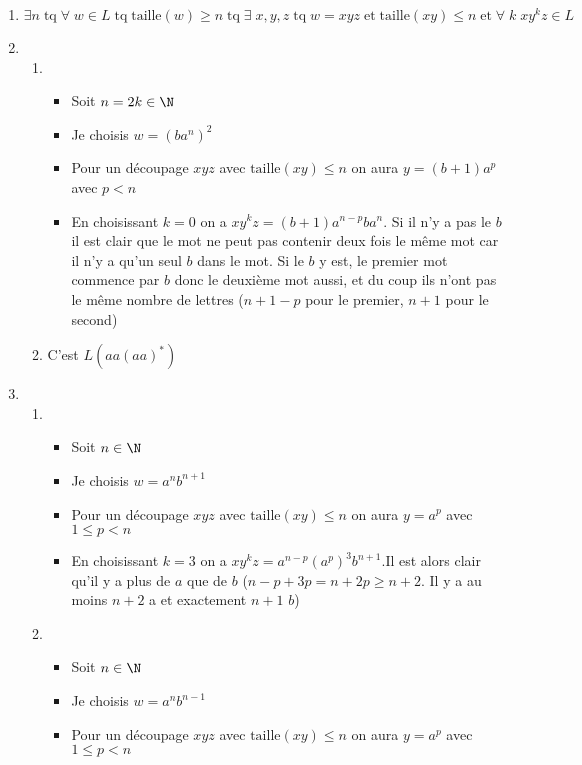 \begin{enumerate}
	\item $\exists n \; \mathrm{tq} \; \forall \; w \in L \; \mathrm{tq} \; \mathrm{taille}(w) \geq n \; \mathrm{tq} \; \exists \; x,y,z \; \mathrm{tq} \; w=xyz \; \mathrm{et} \; \mathrm{taille}(xy) \leq n \; \mathrm{et} \; \forall \; k \; xy^kz \in L$
	\item 
	\begin{enumerate}
		\item 
		\begin{itemize}
			\item Soit $n = 2k \in \N$
			\item Je choisis $w=(ba^n)^2$
			\item Pour un découpage $xyz$ avec $\mathrm{taille}(xy) \leq n$ on aura $y=(b+1)a^p$ avec $p < n$
			\item En choisissant $k=0$ on a $xy^kz = (b+1)a^{n-p}ba^n$. Si il n'y a pas le $b$ il est clair que le mot ne peut pas contenir deux fois le même mot car il n'y a qu'un seul $b$ dans le mot. Si le $b$ y est, le premier mot commence par $b$ donc le deuxième mot aussi, et du coup ils n'ont pas le même nombre de lettres ($n+1-p$ pour le premier, $n+1$ pour le second)
		\end{itemize}
		\item C'est $L(aa(aa)^*)$
	\end{enumerate}
	\item 
	\begin{enumerate}
		\item 
		\begin{itemize}
			\item Soit $n \in \N$
			\item Je choisis $w=a^nb^{n+1}$
			\item Pour un découpage $xyz$ avec $\mathrm{taille}(xy) \leq n$ on aura $y=a^p$ avec $1\leq p<n$
			\item En choisissant $k=3$ on a $xy^kz = a^{n-p}(a^p)^{3}b^{n+1}$.Il est alors clair qu'il y a plus de $a$ que de $b$ ($n-p+3p=n+2p\geq n+2$. Il y a au moins $n+2$ a et exactement $n+1$ $b$)
		\end{itemize}
		\item 
		\begin{itemize}
			\item Soit $n \in \N$
			\item Je choisis $w=a^nb^{n-1}$
			\item Pour un découpage $xyz$ avec $\mathrm{taille}(xy) \leq n$ on aura $y=a^p$ avec $1\leq p<n$

\end{itemize}
\end{enumerate}
\end{enumerate}
